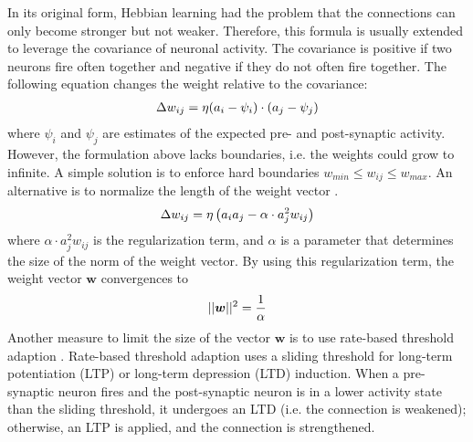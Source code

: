 In its original form, Hebbian learning had the problem that the connections can only become stronger but not weaker.
Therefore, this formula is usually extended to leverage the covariance of neuronal activity.
The covariance is positive if two neurons fire often together and negative if they do not often fire together.
The following equation changes the weight relative to the covariance:
%
\begin{align}\eqlbl{hebb_2}
	\Delta w_{ij} = \eta (a_i - \psi_i) \cdot (a_j - \psi_j)
\end{align}
%
where \(\psi_i\) and \(\psi_j\) are estimates of the expected pre- and post-synaptic activity.
However, the formulation above lacks boundaries, i.e. the weights could grow to infinite.
A simple solution is to enforce hard boundaries \(w_{min} \leq w_{ij} \leq w_{max}\).
An alternative is to normalize the length of the weight vector .
%
\begin{align}\eqlbl{hebb_3}
	\Delta w_{ij} = \eta \left( a_i a_j - \alpha \cdot a^2_j w_{ij} \right)
\end{align}
%
where $\alpha \cdot a^2_j w_{ij}$ is the regularization term, and \(\alpha\) is a parameter that determines the size of the norm of the weight vector.
By using this regularization term, the weight vector $\boldsymbol{w}$ convergences to
%
\begin{align}\eqlbl{hebb_31}
	||\boldsymbol{w}||^2 = \frac{1}{\alpha}
\end{align}
%
Another measure to limit the size of the vector $\boldsymbol{w}$ is to use rate-based threshold adaption . Rate-based threshold adaption uses a sliding threshold for long-term potentiation (LTP) or long-term depression (LTD) induction.
When a pre-synaptic neuron fires and the post-synaptic neuron is in a lower activity state than the sliding threshold, it undergoes an LTD (i.e. the connection is weakened); otherwise, an LTP is applied, and the connection is strengthened.   

